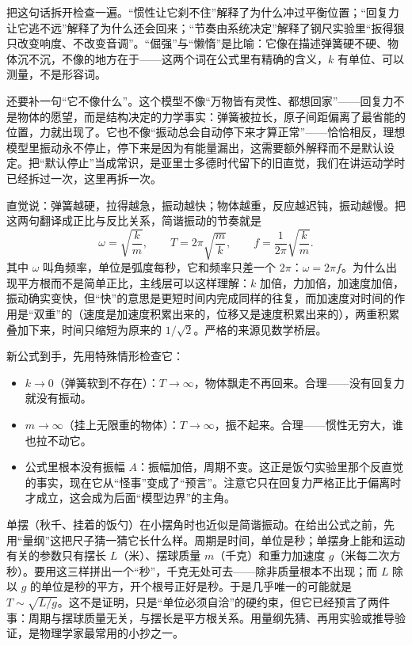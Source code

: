 把这句话拆开检查一遍。“惯性让它刹不住”解释了为什么冲过平衡位置；“回复力让它逃不远”解释了为什么还会回来；“节奏由系统决定”解释了钢尺实验里“扳得狠只改变响度、不改变音调”。“倔强”与“懒惰”是比喻：它像在描述弹簧硬不硬、物体沉不沉，不像的地方在于——这两个词在公式里有精确的含义，\(k\) 有单位、可以测量，不是形容词。

还要补一句“它不像什么”。这个模型不像“万物皆有灵性、都想回家”——回复力不是物体的愿望，而是结构决定的力学事实：弹簧被拉长，原子间距偏离了最省能的位置，力就出现了。它也不像“振动总会自动停下来才算正常”——恰恰相反，理想模型里振动永不停止，停下来是因为有能量漏出，这需要额外解释而不是默认设定。把“默认停止”当成常识，是亚里士多德时代留下的旧直觉，我们在讲运动学时已经拆过一次，这里再拆一次。


直觉说：弹簧越硬，拉得越急，振动越快；物体越重，反应越迟钝，振动越慢。把这两句翻译成正比与反比关系，简谐振动的节奏就是
\[
  \omega=\sqrt{\frac{k}{m}},\qquad
  T=2\pi\sqrt{\frac{m}{k}},\qquad
  f=\frac{1}{2\pi}\sqrt{\frac{k}{m}}.
\]
其中 \(\omega\) 叫角频率，单位是弧度每秒，它和频率只差一个 \(2\pi\)：\(\omega=2\pi f\)。为什么出现平方根而不是简单正比，主线层可以这样理解：\(k\) 加倍，力加倍，加速度加倍，振动确实变快，但“快”的意思是更短时间内完成同样的往复，而加速度对时间的作用是“双重”的（速度是加速度积累出来的，位移又是速度积累出来的），两重积累叠加下来，时间只缩短为原来的 \(1/\sqrt{2}\)。严格的来源见数学桥层。

新公式到手，先用特殊情形检查它：

\begin{itemize}[leftmargin=2em]
  \item \(k\to 0\)（弹簧软到不存在）：\(T\to\infty\)，物体飘走不再回来。合理——没有回复力就没有振动。
  \item \(m\to\infty\)（挂上无限重的物体）：\(T\to\infty\)，振不起来。合理——惯性无穷大，谁也拉不动它。
  \item 公式里根本没有振幅 \(A\)：振幅加倍，周期不变。这正是饭勺实验里那个反直觉的事实，现在它从“怪事”变成了“预言”。注意它只在回复力严格正比于偏离时才成立，这会成为后面“模型边界”的主角。
\end{itemize}

单摆（秋千、挂着的饭勺）在小摆角时也近似是简谐振动。在给出公式之前，先用“量纲”这把尺子猜一猜它长什么样。周期是时间，单位是秒；单摆身上能和运动有关的参数只有摆长 \(L\)（米）、摆球质量 \(m\)（千克）和重力加速度 \(g\)（米每二次方秒）。要用这三样拼出一个“秒”，千克无处可去——除非质量根本不出现；而 \(L\) 除以 \(g\) 的单位是秒的平方，开个根号正好是秒。于是几乎唯一的可能就是 \(T\sim\sqrt{L/g}\)。这不是证明，只是“单位必须自洽”的硬约束，但它已经预言了两件事：周期与摆球质量无关，与摆长是平方根关系。用量纲先猜、再用实验或推导验证，是物理学家最常用的小抄之一。

